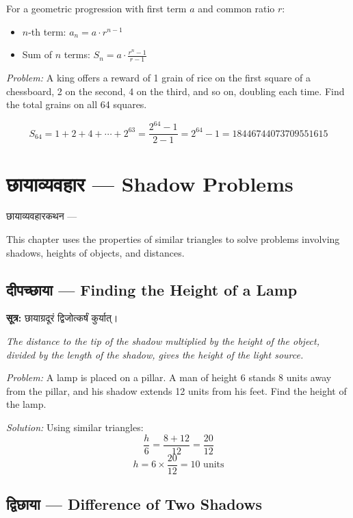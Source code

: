 \documentclass[10pt,a4paper]{article}
\newenvironment{sanskritverse}{%
  \begin{center}%
  \begin{minipage}{0.94\textwidth}%
  \centering\devanagarifont\small%
}{%
  \end{minipage}%
  \end{center}%
  \vspace{0.1em}%
}
\newcommand{\sutratxt}[2]{%
  \begin{center}%
  \colorbox{sanskritbg}{%
    \begin{minipage}{0.93\textwidth}%
    \centering\small\vspace{3pt}%
    {\devanagarifont\textbf{सूत्र:} #1}\par\vspace{2pt}%
    \textit{#2}\vspace{3pt}%
    \end{minipage}%
  }%
  \end{center}%
  \vspace{0.1em}%
}
\begin{document}
For a geometric progression with first term $a$ and common ratio $r$:

\begin{itemize}[itemsep=0pt]
\item $n$-th term: $a_n = a \cdot r^{n-1}$
\item Sum of $n$ terms: $S_n = a \cdot \frac{r^n - 1}{r - 1}$
\end{itemize}

\textit{Problem:} A king offers a reward of 1 grain of rice on the first square of a chessboard, 2 on the second, 4 on the third, and so on, doubling each time. Find the total grains on all 64 squares.

\[
S_{64} = 1 + 2 + 4 + \cdots + 2^{63} = \frac{2^{64} - 1}{2 - 1} = 2^{64} - 1 = 18446744073709551615
\]

\section{छायाव्यवहार — Shadow Problems}
\label{sec:chaya}

\begin{sanskritverse}
छायाव्यवहारकथन ---
\end{sanskritverse}

This chapter uses the properties of similar triangles to solve problems involving shadows, heights of objects, and distances.

\subsection{दीपच्छाया — Finding the Height of a Lamp}

\sutratxt{छायाग्रदूरं द्विजोत्कर्षं कुर्यात्।}{The distance to the tip of the shadow multiplied by the height of the object, divided by the length of the shadow, gives the height of the light source.}

\textit{Problem:} A lamp is placed on a pillar. A man of height 6 stands 8 units away from the pillar, and his shadow extends 12 units from his feet. Find the height of the lamp.

\textit{Solution:} Using similar triangles:
\[
\frac{h}{6} = \frac{8 + 12}{12} = \frac{20}{12}
\]
\[
h = 6 \times \frac{20}{12} = 10 \text{ units}
\]

\subsection{द्विछाया — Difference of Two Shadows}
\end{document}
